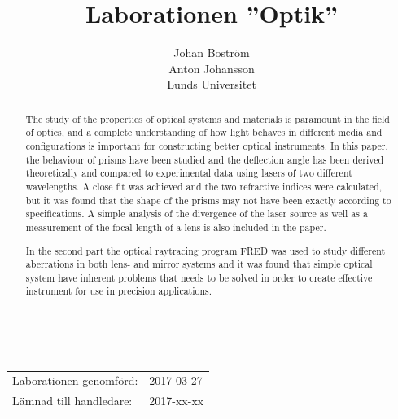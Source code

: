 \documentclass[a4paper]{article}
\title{Laborationen ”Optik”}
\author{Johan Boström\\Anton Johansson\\Lunds Universitet}
\makeatletter
\renewcommand*\maketitle{
  {
    \begin{center}
      {\huge\bfseries \@title}\\
      \vspace{5mm}
      {\large \@author}
    \end{center}
    \vspace{2mm}
  }
}
\makeatother
\begin{document}
\maketitle

\renewcommand{\abstractname}{Abstract} %

\begin{abstract}
  
  The study of the properties of optical systems and materials is paramount in the field of optics, and a complete understanding of how light behaves in different media and configurations is important for constructing better optical instruments. In this paper, the behaviour of prisms have been studied and the deflection angle has been derived theoretically and compared to experimental data using lasers of two different wavelengths. A close fit was achieved and the two refractive indices were calculated, but it was found that the shape of the prisms may not have been exactly according to specifications. A simple analysis of the divergence of the laser source as well as a measurement of the focal length of a lens is also included in the paper.
  
  In the second part the optical raytracing program FRED was used to study different aberrations in both lens- and mirror systems and it was found that simple optical system have inherent problems that needs to be solved in order to create effective instrument for use in precision applications.
  
\end{abstract}

\vspace{2mm}

\hspace{-3mm}
\begin{tabular}{ll}
Laborationen genomförd: &	2017-03-27 \\
Lämnad till handledare: &	2017-xx-xx \\
\end{tabular}
\end{document}
